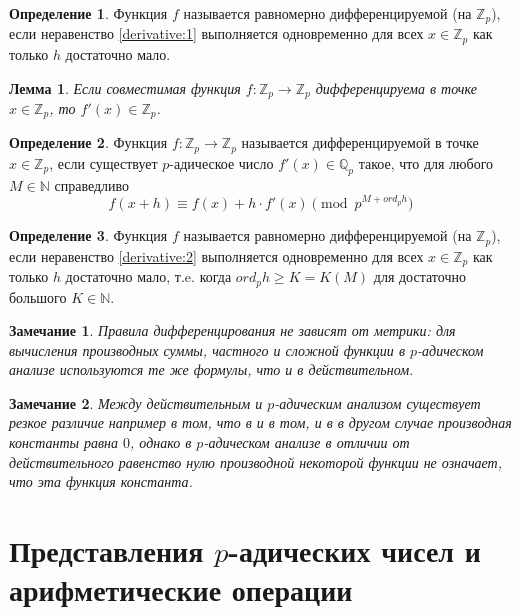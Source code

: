 \documentclass[master, och, diploma, times]{sty/SCWorks}
\theoremstyle{plain}
\newtheorem{lemma}{Лемма}[section]
\newtheorem{note}{Замечание}[section]
\theoremstyle{definition}
\newtheorem{defn}{Определение}[section]
\begin{document}
\begin{defn}
Функция $f$ называется равномерно дифференцируемой (на $\mathbb {Z}_p$), если неравенство \eqref{derivative:1} выполняется одновременно для всех $x \in \mathbb {Z}_p$ как только $h$ достаточно мало. \cite{bib:analysis:anashin:en}
\end{defn}

\begin{lemma}
Если совместимая функция $f:\mathbb {Z}_p \rightarrow \mathbb {Z}_p$ дифференцируема в точке $x \in \mathbb {Z}_p$, то $f'(x) \in \mathbb {Z}_p$.
\end{lemma}

\begin{defn}
Функция $f:\mathbb {Z}_p \rightarrow \mathbb {Z}_p$ называется дифференцируемой в точке $x \in \mathbb {Z}_p$, если существует $p$-адическое число $f'(x) \in \mathbb {Q}_p$ такое, что для любого $M \in \mathbb {N}$ справедливо
\begin{equation} \label{derivative:2}
	f(x+h) \equiv f(x) + h \cdot f'(x) \pmod p^{M + ord_p h}
\end{equation}
\end{defn}

\begin{defn}
Функция $f$ называется равномерно дифференцируемой (на $\mathbb {Z}_p$), если неравенство \eqref{derivative:2} выполняется одновременно для всех $x \in \mathbb {Z}_p$ как только $h$ достаточно мало, т.e. когда $ord_p h \ge K=K(M)$ для достаточно большого $K \in \mathbb {N}$.
\end{defn}

\begin{note}
Правила дифференцирования не зависят от метрики: для вычисления производных суммы, частного и сложной функции в $p$-адическом анализе используются те же формулы, что и в действительном.
\end{note}

\begin{note}
Между действительным и $p$-адическим анализом существует резкое различие например в том, что в и в том, и в в другом случае производная константы равна $0$, однако в $p$-адическом анализе в отличии от действительного равенство нулю производной некоторой функции не означает, что эта функция константа.
\end{note}

\section{Представления $p$-адических чисел и арифметические операции}
\end{document}
